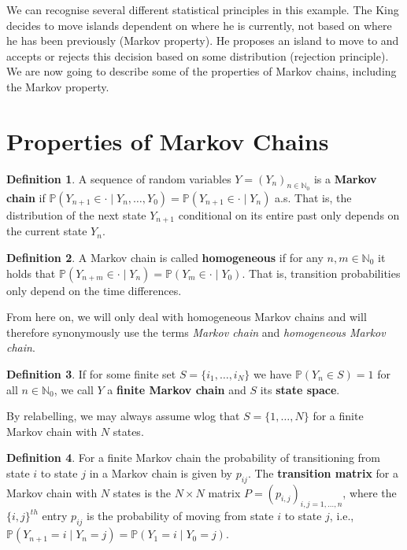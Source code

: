 \documentclass[
]{book}
\theoremstyle{definition}
\newtheorem{definition}{Definition}[chapter]
\theoremstyle{definition}
\theoremstyle{definition}
\theoremstyle{definition}
\theoremstyle{remark}
\begin{document}
We can recognise several different statistical principles in this example. The King decides to move islands dependent on where he is currently, not based on where he has been previously (Markov property). He proposes an island to move to and accepts or rejects this decision based on some distribution (rejection principle). We are now going to describe some of the properties of Markov chains, including the Markov property.

\hypertarget{properties-of-markov-chains}{%
\section{Properties of Markov Chains}\label{properties-of-markov-chains}}

\begin{definition}
\protect\hypertarget{def:Markov}{}\label{def:Markov}A sequence of random variables \(Y = (Y_n)_{n \in \mathbb{N}_0}\) is a \textbf{Markov chain} if \(\mathbb{P}(Y_{n+1} \in \cdot \mid Y_{n}, \ldots, Y_0) = \mathbb{P}(Y_{n+1} \in \cdot \mid Y_{n})\) a.s. That is, the distribution of the next state \(Y_{n+1}\) conditional on its entire past only depends on the current state \(Y_n\).
\end{definition}

\begin{definition} 
A Markov chain is called \textbf{homogeneous} if for any $n,m \in \mathbb{N}_0$ it holds that $\mathbb{P}(Y_{n+ m} \in \cdot \mid Y_n) = \mathbb{P}(Y_{m} \in \cdot \mid Y_0)$. That is, transition probabilities only depend on the time differences.
\end{definition}

From here on, we will only deal with homogeneous Markov chains and will therefore synonymously use the terms \textit{Markov chain} and \textit{homogeneous Markov chain}.

\begin{definition} 
If for some finite set \(S = \{i_1,\ldots,i_N\}\) we have \(\mathbb{P}(Y_n \in S) = 1\) for all $n \in \mathbb{N}_0$, we call \(Y\) a \textbf{finite Markov chain} and \(S\) its \textbf{state space}.
\end{definition}

By relabelling, we may always assume wlog that \(S = \{1,\ldots,N\} \) for a finite Markov chain with $N$ states.

\begin{definition}
For a finite Markov chain the probability of transitioning from state \(i\) to state \(j\) in a Markov chain is given by \(p_{ij}\). The \textbf{transition matrix} for a Markov chain with \(N\) states is the \(N \times N\) matrix \(P = (p_{i,j})_{i,j=1,\ldots,n}\), where the \(\{i, j\}^{th}\) entry  \(p_{ij}\) is the probability  of moving from state \(i\) to state \(j\), i.e., \(\mathbb{P}(Y_{n+1} = i \mid Y_n = j) = \mathbb{P}(Y_{1} = i \mid Y_0 = j).\)
\end{definition}
\end{document}
